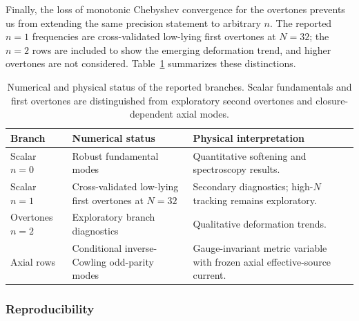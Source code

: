 \documentclass[12pt,a4paper]{article}
\begin{document}
\color{blue}
Finally, the loss of monotonic Chebyshev convergence for the overtones prevents
us from extending the same precision statement to arbitrary \(n\). The
reported \(n=1\) frequencies are cross-validated low-lying first overtones at
\(N=32\); the \(n=2\) rows are included to show the emerging deformation trend,
and higher overtones are not considered. Table~\ref{tab:claimhierarchy}
summarizes these distinctions.
\color{black}

\begin{table}[!htbp]
\centering
\footnotesize
\renewcommand{\arraystretch}{1.16}
\setlength{\tabcolsep}{3pt}
\color{blue}
\begin{tabularx}{\columnwidth}{>{\raggedright\arraybackslash}p{}>{\raggedright\arraybackslash}p{}>{\raggedright\arraybackslash}X}
\toprule
Branch & Numerical status & Physical interpretation \\
\midrule
Scalar \(n=0\) & Robust fundamental modes & Quantitative softening and spectroscopy results. \\
Scalar \(n=1\) & Cross-validated low-lying first overtones at \(N=32\) & Secondary diagnostics; high-\(N\) tracking remains exploratory. \\
Overtones \(n=2\) & Exploratory branch diagnostics & Qualitative deformation trends. \\
Axial rows & Conditional inverse-Cowling odd-parity modes & Gauge-invariant metric variable with frozen axial effective-source current. \\
\bottomrule
\end{tabularx}
\caption{Numerical and physical status of the reported branches. Scalar
fundamentals and first overtones are distinguished from exploratory second
overtones and closure-dependent axial modes.}
\color{black}
\label{tab:claimhierarchy}
\end{table}

\subsubsection{Reproducibility}
\end{document}
